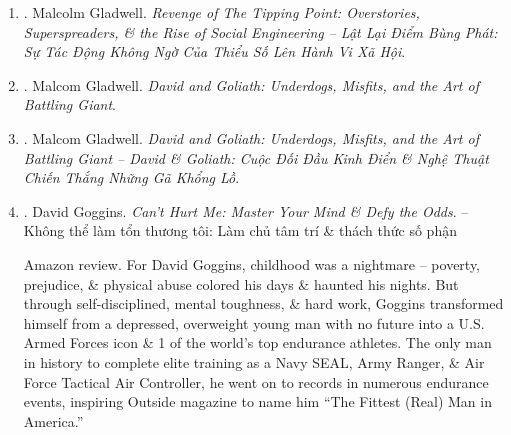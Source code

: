 \documentclass{article}
\begin{document}
\begin{enumerate}
	\item \cite{Gladwell_revenge_tipping_point_VN}. {\sc Malcolm Gladwell}. {\it Revenge of The Tipping Point: Overstories, Superspreaders, \& the Rise of Social Engineering -- Lật Lại Điểm Bùng Phát: Sự Tác Động Không Ngờ Của Thiểu Số Lên Hành Vi Xã Hội}.\hfill{\sf[done]}

	\item \cite{Gladwell_David_Goliath}. {\sc Malcom Gladwell}. {\it David and Goliath: Underdogs, Misfits, and the Art of Battling Giant}.

	\item \cite{Gladwell_David_Goliath_VN}. {\sc Malcom Gladwell}. {\it David and Goliath: Underdogs, Misfits, and the Art of Battling Giant -- David \& Goliath: Cuộc Đối Đầu Kinh Điển \& Nghệ Thuật Chiến Thắng Những Gã Khổng Lồ}.\hfill{\sf[done]}

	\item \cite{Goggins_hurt}. {\sc David Goggins}. {\it Can't Hurt Me: Master Your Mind \& Defy the Odds}. -- Không thể làm tổn thương tôi: Làm chủ tâm trí \& thách thức số phận {}

	{\sf Amazon review.} For {\sc David Goggins}, childhood was a nightmare -- poverty, prejudice, \& physical abuse colored his days \& haunted his nights. But through self-disciplined, mental toughness, \& hard work, {\sc Goggins} transformed himself from a depressed, overweight young man with no future into a U.S. Armed Forces icon \& 1 of the world's top endurance athletes. The only man in history to complete elite training as a Navy SEAL, Army Ranger, \& Air Force Tactical Air Controller, he went on to records in numerous endurance events, inspiring Outside magazine to name him ``The Fittest (Real) Man in America.''


\end{enumerate}
\end{document}

